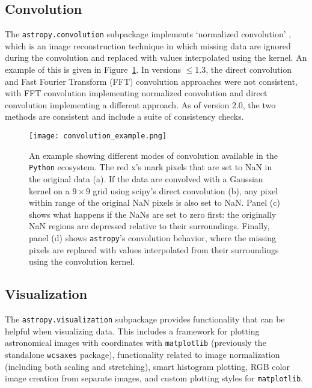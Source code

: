 \documentclass[modern]{aastex61}
\newcommand{\package}[1]{\texttt{#1}\xspace}
\newcommand{\python}{\package{Python}}
\newcommand{\astropypkg}{\package{astropy}}
\renewcommand{\figurename}{Figure\xspace}
\begin{document}
\subsection{Convolution}

The \package{astropy.convolution} subpackage implements `normalized convolution' \citep[e.g.,][]{Knutsson1993}, which is an image reconstruction technique in which missing data are ignored during the convolution and replaced with values interpolated using the kernel.   An example of this is given in \figurename~\ref{fig:convolution-example}.  In versions $\leq 1.3$, the direct convolution and Fast Fourier Transform (FFT) convolution approaches were not consistent, with FFT convolution implementing normalized convolution and direct convolution implementing a different approach.  As of version 2.0, the two methods are consistent and include a suite of consistency checks.

\begin{figure}
\texttt{[image: convolution\_example.png]}
\caption{%
    An example showing different modes of convolution available in the \python
    ecosystem.  The red x's mark pixels that are set to NaN in the original data
    (a).  If the data are convolved with a Gaussian kernel on a $9\times 9$ grid using
    scipy's direct convolution (b), any pixel within range of the original NaN
    pixels is also set to NaN.  Panel (c) shows what happens if the NaNs are set
    to zero first: the originally NaN regions are depressed relative to their
    surroundings.  Finally, panel (d) shows \astropypkg's convolution behavior,
    where the missing pixels are replaced with values interpolated from their
    surroundings using the convolution kernel.
    \label{fig:convolution-example}
}
\end{figure}


\subsection{Visualization}

The \package{astropy.visualization} subpackage provides functionality that can be helpful when visualizing data. This includes a framework for plotting astronomical images with coordinates with \package{matplotlib} (previously the standalone \package{wcsaxes} package), functionality related to image normalization (including both scaling and stretching), smart histogram plotting, RGB color image creation from separate images, and custom plotting styles for \package{matplotlib}.
\end{document}
